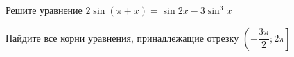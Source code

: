 \begin{ex}
	\begin{condition}
		\begin{enumcols}[label=\asbuk*)]
			\item Решите уравнение \( 2\sin{(\pi + x)}=\sin 2x - 3\sin^3 x \)
			\item Найдите все корни уравнения, принадлежащие отрезку \( \left(-\dfrac{3\pi}{2};2\pi\right] \)
		\end{enumcols}
	\end{condition}
\end{ex}